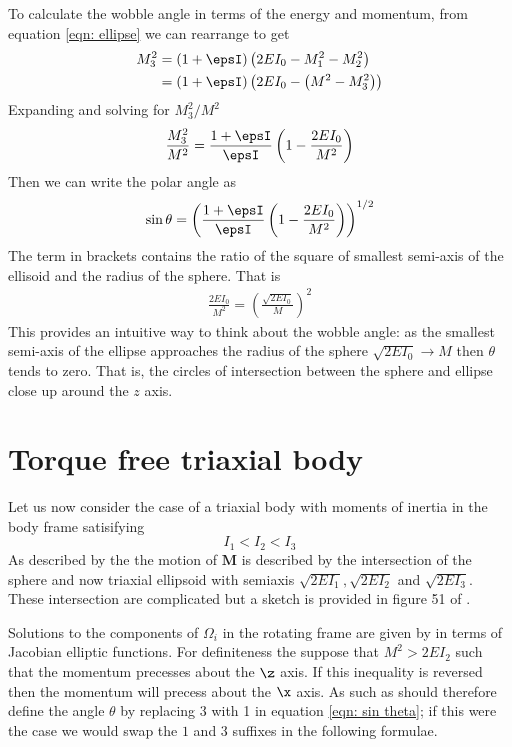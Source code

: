 \documentclass[/home/greg/Thesis/main/main.tex]{subfiles}
\begin{document}
To calculate the wobble angle in terms of the energy and momentum, 
from equation \eqref{eqn: ellipse} we can rearrange to get
\begin{align}
    M_{3}^{2} & = (1+\epsI)\left(2EI_{0} - M_{1}^{2} - M_{2}^{2}\right) \\
              & = (1+\epsI)\left(2EI_{0} - \left(M^{2} - M_{3}^{2}\right)\right)
\end{align}
Expanding and solving for $M_{3}^{2}/M^{2}$ 
\begin{align}
    \frac{M_{3}^{2}}{M^{2}} = \frac{1+\epsI}{\epsI}\left(1 - \frac{2EI_{0}}{M^{2}}\right)
\end{align}
Then we can write the polar angle as
\begin{equation}
    \sin\theta = \left(\frac{1+\epsI}{\epsI}\left(1 - \frac{2EI_{0}}{M^{2}}\right)\right)^{1/2}
    \label{eqn: sin theta biaxial}
\end{equation}
The term in brackets contains the ratio of the square of smallest semi-axis of
the ellisoid and the radius of the sphere. That is
\begin{align}
    \frac{2EI_{0}}{M^{2}} = \left(\frac{\sqrt{2EI_{0}}}{M}\right)^{2}
\end{align}
This provides an intuitive way to think about the wobble angle: as the smallest
semi-axis of the ellipse approaches the radius of the sphere $\sqrt{2EI_{0}}\rightarrow M$
then $\theta$ tends to zero. That is, the circles of intersection between the
sphere and ellipse close up around the $z$ axis.

\section{Torque free triaxial body}
Let us now consider the case of a triaxial body with moments of inertia in the
body frame satisifying
\begin{equation}
    I_{1} < I_{2} < I_{3}
\end{equation}
As described by the \citet{Landau1969} the motion of $\mathbf{M}$ is
described by the intersection of the sphere and now triaxial ellipsoid
with semiaxis $\sqrt{2EI_{1}}, \sqrt{2EI_{2}}$ and $\sqrt{2EI_{3}}$. These 
intersection are complicated but a sketch is provided in figure 51 of 
\citet{Landau1969}.


Solutions to the components of $\Omega_{i}$ in the rotating frame are given 
by \citet{Landau1969} in terms of Jacobian elliptic functions. For definiteness
the suppose that $M^{2} > 2EI_{2}$ such that the momentum precesses about the
$\z$ axis. If this inequality is reversed then the momentum will precess
about the $\x$ axis. As such as should therefore define the angle $\theta$ 
by replacing 3 with 1 in equation \eqref{eqn: sin theta}; if this were the case
we would swap the $1$ and $3$ suffixes in the following formulae.
\end{document}
